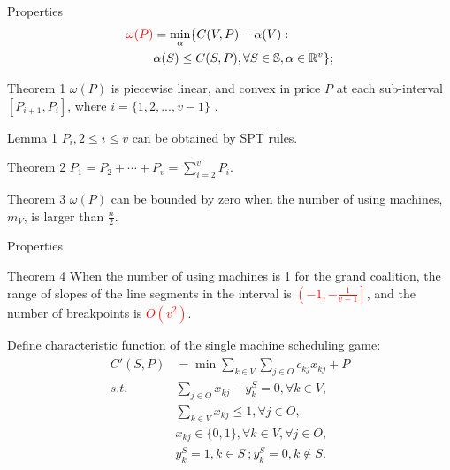 \documentclass[14pt]{beamer}
\begin{document}
\begin{frame}{Properties}
	\vspace{-10mm}
	\small
		\begin{eqnarray*}
		\textcolor{red}{\omega(P)}& =\mathop{\min}_{\alpha}\{C(V,P)-\alpha(V): \\
		 &\alpha(S)\leq C(S,P),\forall S \in \mathbb{S}, \alpha\in\mathbb{R}^{v}\};
		\end{eqnarray*}
		\vspace{-10mm}
		\footnotesize
		\begin{block}{Theorem 1}
		${\omega(P)}$ is piecewise linear, and convex in price $P$ at each sub-interval $[P_{i+1},P_i]$, where $i=\{1,2,...,v-1\}$ .
		\end{block}

		\begin{block}{Lemma 1}
		$P_i, 2 \leq i \leq v$ can be obtained by SPT rules.
		\end{block}

		\begin{block}{Theorem 2}
		$P_{1}=P_{2}+\cdots+P_{v}=\sum_{i=2}^v P_i$.
		\end{block}

		\begin{block}{Theorem 3}
		$\omega(P)$ can be bounded by zero when the number of using machines, $m_V$, is larger than $\frac{n}{2}$.
		\end{block}
\end{frame}


\begin{frame}{Properties}
	\vspace{-2mm}
	\small
		\begin{block}{Theorem 4}
			When the number of using machines is 1 for the grand coalition, the range of slopes of the line segments in the interval is \textcolor{red}{$\left( -1 , -\frac{1}{v-1} \right]$}, and the number of breakpoints is \textcolor{red}{$ O(v^2)$}.
		\end{block}

		\begin{block}{Define characteristic function of the single machine scheduling game:}
		\small
		\vspace{-5mm}
		\begin{eqnarray*}\label{eqn:IVPU}
		\begin{aligned}
		C'(S,P)   &= {\min} \sum_{k \in V}\sum_{j \in O} {c_{kj} x_{kj}} + P \\
		{s.t.}\quad & \sum_{j \in O} x_{kj}-y_k^S=0, \forall k \in V, \\
		& \sum_{k\in V} x_{kj} \leq 1,\forall j \in O,  \\
		& x_{kj} \in \{0,1\} , \forall k \in V, \forall j \in O,\\
		& y_k^S=1, k \in S~; y_k^S=0, k \notin S.
		\end{aligned}
		\end{eqnarray*}
		\end{block}
\end{frame}
\end{document}
